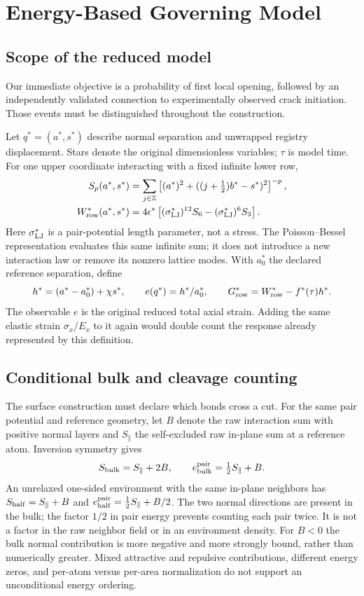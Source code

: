 \documentclass[11pt]{article}
\begin{document}
\section{Energy-Based Governing Model}
\subsection{Scope of the reduced model}
Our immediate objective is a probability of first local opening, followed by
an independently validated connection to experimentally observed crack initiation.
Those events must be distinguished throughout the construction.

Let $q^*=(a^*,s^*)$ describe normal separation and unwrapped registry displacement.
Stars denote the original dimensionless variables; $\tau$ is model time.
For one upper coordinate interacting with a fixed infinite lower row,
\begin{align}
 S_p(a^*,s^*)&=\sum_{j\in\mathbb Z}
 \left[(a^*)^2+((j+\tfrac12)b^*-s^*)^2\right]^{-p},\\
 W_{\rm row}^*(a^*,s^*)&=4\epsilon^*
 \left[(\sigma_{\rm LJ}^*)^{12}S_6-(\sigma_{\rm LJ}^*)^6S_3\right].
\end{align}
Here $\sigma_{\rm LJ}^*$ is a pair-potential length parameter, not a stress.
The Poisson--Bessel representation evaluates this same infinite sum;
it does not introduce a new interaction law or remove its nonzero lattice modes.
With $a_0^*$ the declared reference separation, define
\begin{equation}
 h^*=(a^*-a_0^*)+\chi s^*,\qquad
 e(q^*)=h^*/a_0^*,\qquad G_{\rm row}^*=W_{\rm row}^*-f^*(\tau)h^*.
\end{equation}
The observable $e$ is the original reduced total axial strain.
Adding the same elastic strain $\sigma_x/E_x$ to it again would double count
the response already represented by this definition.

\subsection{Conditional bulk and cleavage counting}
\label{sec:surface-bulk-count}
The surface construction must declare which bonds cross a cut.  For the
same pair potential and reference geometry, let $B$ denote the raw
interaction sum with positive normal layers and $S_\parallel$ the
self-excluded raw in-plane sum at a reference atom.  Inversion symmetry gives
\begin{equation}
 S_{\rm bulk}=S_\parallel+2B,\qquad
 e_{\rm bulk}^{\rm pair}=\tfrac12S_\parallel+B .
 \label{eq:r10-bulk-count}
\end{equation}
An unrelaxed one-sided environment with the same in-plane neighbors has
$S_{\rm half}=S_\parallel+B$ and
$e_{\rm half}^{\rm pair}=\tfrac12S_\parallel+B/2$.
The two normal directions are present in the bulk; the factor $1/2$ in
pair energy prevents counting each pair twice.  It is not a factor in
the raw neighbor field or in an environment density.  For $B<0$ the bulk
normal contribution is more negative and more strongly bound, rather
than numerically greater.  Mixed attractive and repulsive contributions,
different energy zeros, and per-atom versus per-area normalization do
not support an unconditional energy ordering.
\end{document}
